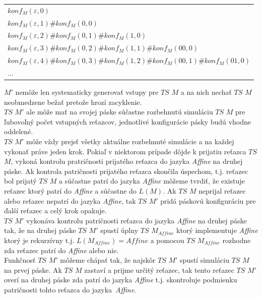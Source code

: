 \documentclass[11pt,a4paper]{article}
\begin{document}
\begin{center}
    \begin{tabular}{l}
        $konf_M(\varepsilon,0)$\\
        $konf_M(\varepsilon,1)\#konf_M(0,0)$\\
        $konf_M(\varepsilon,2)\#konf_M(0,1)\#konf_M(1,0)$\\
        $konf_M(\varepsilon,3)\#konf_M(0,2)\#konf_M(1,1)\#konf_M(00,0)$\\
        $konf_M(\varepsilon,4)\#konf_M(0,3)\#konf_M(1,2)\#konf_M(00,1)\#konf_M(01,0)$\\
        ...
    \end{tabular}
\end{center}

$M'$ nemôže len systematicky generovať vstupy pre $TS$ $M$ a na nich nechať $TS$ $M$ neobmedzene bežať pretože hrozí zacyklenie.\\

$TS$ $M'$ ale môže mať na svojej páske súčastne rozbehnutú simuláciu $TS$ $M$ pre ľubovoľný počet vstupných reťazcov, jednotlivé konfigurácie pásky budú vhodne oddelené.\\

$TS$ $M'$ môže vždy prejsť všetky aktuálne rozbehnuté simulácie a na každej vykonať práve jeden krok.
Pokiaľ v niektorom prípade dôjde k prijatiu reťazca $TS$ $M$, vykoná kontrolu pratričnosti prijatého reťazca do jazyka \textit{Affine} na druhej páske. Ak kontrola patričnosti prijatého reťazca skončila úspechom, t.j. reťazec bol prijatý $TS$ $M$ a súčastne patrí do jazyka \textit{Affine} môžeme tvrdiť, že existuje reťazec ktorý patrí do \textit{Affine} a súčastne do $L(M)$. Ak $TS$ $M$ neprijal reťazec alebo reťazec nepatrí do jazyka \textit{Affine}, tak $TS$ $M'$ pridá páskovú konfiguráciu pre ďalší reťazec a celý krok opakuje.\\

$TS$ $M'$ vykonáva kontrolu patričnosti reťazca do jazyka \textit{Affine} na druhej páske tak, že na druhej páske $TS$ $M'$ spustí úplny $TS$ $M_{Affine}$ ktorý implementuje \textit{Affine} ktorý je rekurzívny t.j. $L(M_{Affine}) = Affine$ a pomocou $TS$ $M_{Affine}$ rozhodne zda reťazec patrí do \textit{Affine} alebo nie.\\

Funkčnosť $TS$ $M'$ môžeme chápať tak, že najskôr $TS$ $M'$ spustí simuláciu $TS$ $M$ na prvej páske. Ak $TS$ $M$ zastaví a prijme určitý reťazec, tak tento reťazec $TS$ $M'$ overí na druhej páske zda patrí do jazyka \textit{Affine} t.j. skontroluje podmienku patričnosti tohto reťazca do jazyka \textit{Affine}.
\end{document}
